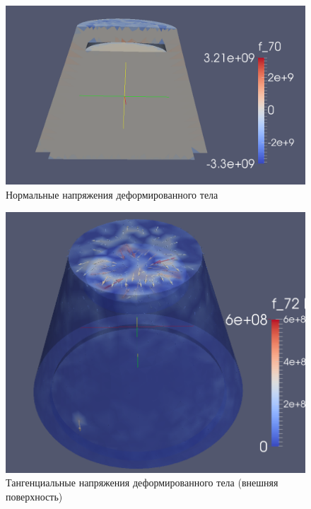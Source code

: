 \documentclass[a4paper, 14pt]{extreport}
\begin{document}
\begin{figure}[H]
	\center
	\includegraphics[scale=0.4]{pictures/result_pull_normal_stress_slice.png}
	\caption{Нормальные напряжения деформированного тела}
	\label{fig: result_pull_normal_stress_slice}
\end{figure}

\begin{figure}[H]
	\center
	\includegraphics[scale=0.4]{pictures/result_pull_shear_stress_full.png}
	\caption{Тангенциальные напряжения деформированного тела (внешняя поверхность)}
	\label{fig: result_pull_shear_stress_full}
\end{figure}
\end{document}
